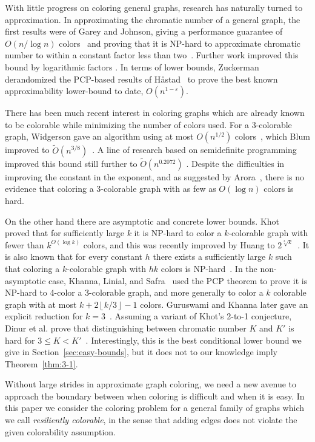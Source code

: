 \documentclass{article}[11pt]  %
\begin{document}
With little progress on coloring general graphs, research has naturally turned
to approximation. In approximating the chromatic number of a general graph, the
first results were of Garey and Johnson, giving a performance guarantee of
$O(n/\log n)$ colors~\cite{Johnson74} and proving that it is NP-hard to
approximate chromatic number to within a constant factor less than
two~\cite{GJ76}. Further work improved this bound by logarithmic factors
\cite{BR90,Ha93}. In terms of lower bounds, Zuckerman~\cite{Zu07} derandomized
the PCP-based results of H{\aa}stad~\cite{Ha99} to prove the best known
approximability lower-bound to date, $O(n^{1-\varepsilon})$.

There has been much recent interest in coloring graphs which are already known
to be colorable while minimizing the number of colors used. For a 3-colorable
graph, Widgerson gave an algorithm using at most $O(n^{1/2})$
colors~\cite{Wi83}, which Blum improved to $\tilde{O}(n^{3/8})$~\cite{Blum94}.
A line of research based on semidefinite programming improved this bound still
further to $\tilde{O}(n^{0.2072})$ \cite{Ka98,Blum97,Arora06,Chl09}. Despite
the difficulties in improving the constant in the exponent, and as suggested by
Arora~\cite{Arora11}, there is no evidence that coloring a 3-colorable graph
with as few as $O(\log n)$ colors is hard.

On the other hand there are asymptotic and concrete lower bounds.
Khot~\cite{Khot01} proved that for sufficiently large $k$ it is NP-hard to
color a $k$-colorable graph with fewer than $k^{O(\log{k})}$ colors, and this
was recently improved by Huang to $2^{\sqrt[3]{k}}$~\cite{Huang13}. It is also
known that for every constant $h$ there exists a sufficiently large $k$ such
that coloring a $k$-colorable graph with $hk$ colors is NP-hard~\cite{DMR06}.
In the non-asymptotic case, Khanna, Linial, and Safra~\cite{KLS00} used the PCP
theorem to prove it is NP-hard to 4-color a 3-colorable graph, and more
generally to color a $k$ colorable graph with at most $k + 2\left \lfloor k/3
\right \rfloor - 1$ colors. Guruswami and Khanna later gave an explicit
reduction for $k=3$~\cite{GuKh2000}. Assuming a variant of Khot's 2-to-1
conjecture, Dinur et al. prove that distinguishing between chromatic number $K$
and $K'$ is hard for $3 \leq K < K'$~\cite{DMR06}.  Interestingly, this is the
best conditional lower bound we give in Section~\ref{sec:easy-bounds}, but it
does not to our knowledge imply Theorem~\ref{thm:3-1}.

Without large strides in approximate graph coloring, we need a new avenue to
approach the boundary between when coloring is difficult and when it is easy.
In this paper we consider the coloring problem for a general family of graphs
which we call \emph{resiliently colorable}, in the sense that adding edges does
not violate the given colorability assumption. 
\end{document}
